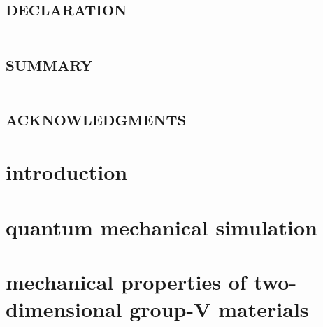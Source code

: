 \documentclass[twoside,12pt]{report}
\begin{document}

%

\thispagestyle{empty}

\clearpage\null\thispagestyle{empty}\newpage

\chapter*{\textsc {\centering \LARGE declaration}}
\renewcommand{\thepage}{\roman{page}}
\setcounter{page}{1}
\thispagestyle{empty}
\setcounter{page}{1}


\clearpage\null\thispagestyle{empty}\newpage
{}
\chapter*{\textsc {\centering \LARGE summary}}

%
\cleardoublepage
{}
\chapter*{\textsc {\centering \LARGE acknowledgments}}




\cleardoublepage
{}
\listoffigures


%
\tableofcontents
\clearpage\null\thispagestyle{empty}\newpage


\pagestyle{fancy}
\renewcommand{\thepage}{\arabic{page}}
\setcounter{page}{1}
%
\chapter{\sc introduction}
\label{ch:introduction}



\chapter{\sc quantum mechanical simulation}
\label{ch:qm_simulation}



\chapter[\sc mechanical properties of two-dimensional \break group-V materials]{\sc mechanical properties of two-dimensional group-V materials}
\label{ch:mech_prop_2d_mater}

\end{document}
